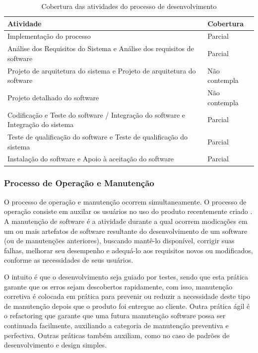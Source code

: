\begin{table}[htb]
      \begin{center}
        \begin{tabular}{| p{6cm} | l |}
        \hline
        \textbf{Atividade} & \textbf{Cobertura} \\ \hline
        Implementação do processo & Parcial \\ \hline
        Análise dos Requisitos do Sistema e Análise dos requisitos de software & Parcial \\ \hline
        Projeto de arquitetura do sistema e Projeto de arquitetura do software & Não contempla \\ \hline
        Projeto detalhado do software & Não contempla \\ \hline
        Codificação e Teste do software / Integração do software e Integração do sistema & Parcial \\ \hline
        Teste de qualificação do software e Teste de qualificação do sistema & Parcial \\ \hline
        Instalação do software e Apoio à aceitação do software & Parcial \\ \hline
        \end{tabular}
      \end{center}
    \caption{Cobertura das atividades do processo de desenvolvimento}
    \end{table}


\subsubsection{\large{Processo de Operação e Manutenção}}
\label{sec:operacao}

O processo de operação e manutenção ocorrem simultaneamente. O processo de operação consiste em auxilar os usuários no uso do produto recentemente criado \cite{iso12207:95}. A manutenção de software é a atividade durante a qual ocorrem modicações em um ou mais artefatos de software resultante do desenvolvimento de um software (ou de manutenções anteriores), buscando mantê-lo disponível, corrigir suas falhas, melhorar seu desempenho e adequá-lo aos requisitos novos ou modificados, conforme as necessidades de seus usuários\cite{IEEE1990}.

O intuito é que o desenvolvimento seja guiado por testes, sendo que esta prática garante que os erros sejam descobertos rapidamente, com isso, manutenção corretiva é colocada em prática para prevenir ou reduzir a necessidade deste tipo de manutenção depois que o produto foi entregue ao cliente.
Outra prática ágil é o refactoring que garante que uma futura manutenção software possa ser continuada facilmente, auxiliando a categoria de manutenção preventiva e perfectiva.
Outras práticas também auxiliam, como no caso de padrões de desenvolvimento e design simples.

